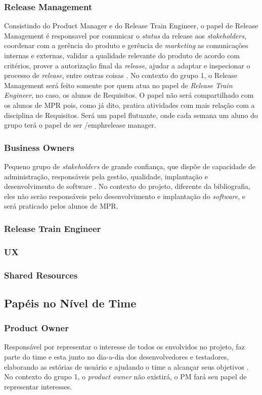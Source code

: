 \subsubsection{Release Management}
Consistindo do Product Manager e do Release Train Engineer, o papel de Release Management é responsavel por comunicar o \emph{status} da release aos \emph{stakeholders}, coordenar com a gerência do produto e gerência de \emph{marketing} as comunicações internas e externas, validar a qualidade relevante do produto de acordo com critérios, prover a autorização final da \emph{release}, ajudar a adaptar e inspecionar o processo de \emph{release}, entre outras coisas \cite{safesite001}.
No contexto do grupo 1, o Release Management será feito somente por quem atua no papel de \emph{Release Train Engineer}, no caso, os alunos de Requisitos. O papel não será compartilhado com os alunos de MPR pois, como já dito, pratica atividades com mais relação com a disciplina de Requisitos. Será um papel flutuante, onde cada semana um aluno do grupo terá o papel de ser /emph{release manager}.

\subsubsection{Business Owners}
Pequeno grupo de \emph{stakeholders} de grande confiança, que dispõe de capacidade de administração, responsáveis pela gestão, qualidade, implantação e desenvolvimento de software \cite{safesite001}. No contexto do projeto, diferente da bibliografia, eles não serão responsáveis pelo desenvolvimento e implantação do \emph{software}, e será praticado pelos alunos de MPR.

\subsubsection{Release Train Engineer}
\subsubsection{UX}
\subsubsection{Shared Resources}

\subsection{Papéis no Nível de Time}

\subsubsection{Product Owner}
Responsável por representar o interesse de todos os envolvidos no projeto, faz parte do time e esta junto no dia-a-dia dos desenvolvedores e testadores, elaborando as estórias de usuário e ajudando o time a alcançar seus objetivos \cite[p. 47-48]{safe001}. No contexto do grupo 1, o \emph{product owner} não existirá, o PM fará seu papel de representar interesses.

